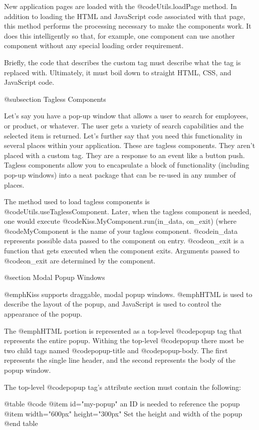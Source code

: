 New application pages are loaded with the @code{Utils.loadPage}
method.  In addition to loading the HTML and JavaScript code
associated with that page, this method performs the processing
necessary to make the components work.  It does this intelligently so
that, for example, one component can use another component without any
special loading order requirement.

Briefly, the code that describes the custom tag must describe what the
tag is replaced with.  Ultimately, it must boil down to straight HTML,
CSS, and JavaScript code.


@subsection Tagless Components

Let's say you have a pop-up window that allows a user to search for employees, or product, or whatever.
The user gets a variety of search capabilities and the selected item is returned. Let's further say
that you need this functionality in several places within your application.  These are tagless
components.  They aren't placed with a custom tag.  They are a response to an event like a button push.
Tagless components allow you to encapsulate a block of functionality (including pop-up windows) into
a neat package that can be re-used in any number of places.

The method used to load tagless components is
@code{Utils.useTaglessComponent}.  Later, when the tagless component
is needed, one would execute @code{Kiss.MyComponent.run(in_data, on_exit)} (where
@code{MyComponent} is the name of your tagless component.  
@code{in_data} represents possible data passed to the component on entry.
@code{on_exit} is a function that gets executed when the component exits.
Arguments passed to @code{on_exit} are determined by the component.


@section Modal Popup Windows

@emph{Kiss} supports draggable, modal popup windows. @emph{HTML} is
used to describe the layout of the popup, and JavaScript is used to
control the appearance of the popup.

The @emph{HTML} portion is represented as a top-level @code{popup} tag
that represents the entire popup.  Withing the top-level @code{popup}
there most be two child tags named @code{popup-title} and
@code{popup-body}.  The first represents the single line header, and
the second represents the body of the popup window.

The top-level @code{popup} tag's attribute section must contain the following:

@table @code
@item id="my-popup"
an ID is needed to reference the popup
@item width="600px" height="300px"
Set the height and width of the popup
@end table


